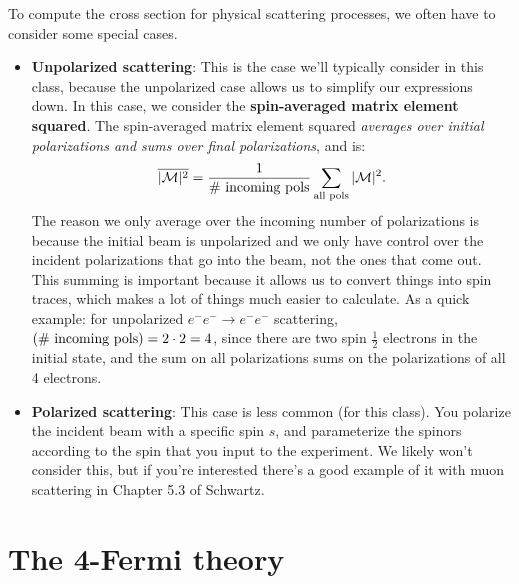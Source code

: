 \documentclass[12pt, oneside]{article}   	%
\theoremstyle{definition}
\begin{document}
To compute the cross section for physical scattering processes, we often have to consider some special cases.
\begin{itemize}
	\item \textbf{Unpolarized scattering}: This is the case we'll typically consider in this class, because the unpolarized case allows us to simplify our expressions down. In this case, we consider the \textbf{spin-averaged matrix element squared}. The spin-averaged matrix element squared \textit{averages over initial polarizations and sums over final polarizations}, and is:
	\begin{equation}
		\overline{|\mathcal M|^2} = \frac{1}{\#\textnormal{ incoming pols}} \sum_{\textnormal{all pols}} |\mathcal M|^2.
	\end{equation}
	The reason we only average over the incoming number of polarizations is because the initial beam is unpolarized and we only have control over the incident polarizations that go into the beam, not the ones that come out. This summing is important because it allows us to convert things into spin traces, which makes a lot of things much easier to calculate. As a quick example: for unpolarized $e^- e^- \rightarrow e^- e^-$ scattering, $(\#\textnormal{ incoming pols}) = 2\cdot 2 = 4$, since there are two spin $\frac{1}{2}$ electrons in the initial state, and the sum on all polarizations sums on the polarizations of all 4 electrons. 
	
	\item \textbf{Polarized scattering}: This case is less common (for this class). You polarize the incident beam with a specific spin $s$, and parameterize the spinors according to the spin that you input to the experiment. We likely won't consider this, but if you're interested there's a good example of it with muon scattering in Chapter 5.3 of Schwartz. 
\end{itemize}

\section*{The 4-Fermi theory}
\end{document}
